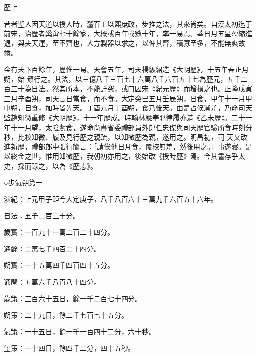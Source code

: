 
\begin{pinyinscope}

 歷上



 昔者聖人因天道以授人時，釐百工以熙庶政，步推之法，其來尚矣。自漢太初迄于前宋，治歷者奚啻七十餘家，大概或百年或數十年，率一易焉。蓋日月五星盈縮進退，與夫天運，至不齊也，人方製器以求之，以俾其齊，積寡至多，不能無爽故爾。



 金有天下百餘年，歷惟一易。天會五年，司天楊級紹造《大明歷》，十五年春正月朔，始
 頒行之。其法，以三億八千三百七十六萬八千六百五十七為歷元，五千二百三十為日法。然其所本，不能詳究，或曰因宋《紀元歷》而增損之也。正隆戊寅三月辛酉朔，司天言日當食，而不食。大定癸巳五月壬辰朔，日食，甲午十一月甲申朔，日食，加時皆先天。丁酉九月丁酉朔，食乃後天。由是占候漸差，乃命司天監趙知微重修《大明歷》，十一年歷成。時翰林應奉耶律履亦造《乙未歷》。二十一年十一月望，太陰虧食，遂命尚書省委禮部員外郎任忠傑與司天歷官驗所食時刻分秒，比校知微、履及見行歷之親疏，以知微歷為親，遂用之。明昌初，司
 天又改進新歷，禮部郎中張行簡言：「請俟他日月食，覆校無差，然後用之。」事遂寢。是以終金之世，惟用知微歷，我朝初亦用之，後始改《授時歷》焉。今其書存乎太史，採而錄之，以為《歷志》。



 ○步氣朔第一



 演紀：上元甲子距今大定庚子，八千八百六十三萬九千六百五十六年。



 日法：五千二百三十分。



 歲實：一百九十一萬二百二十四分。



 通餘：二萬七千四百二十四分。



 朔實：一十五萬四千四百四十五分。



 通閏：五萬六千八百八十四分。



 歲策：三百六十五日，餘一千二百七十四分。



 朔策：二十九日，餘二千七百七十五分。



 氣策：一十五日，餘一千一百四十二分，六十秒。



 望策：一十四日，餘四千二分，四十五秒。




\end{pinyinscope}
